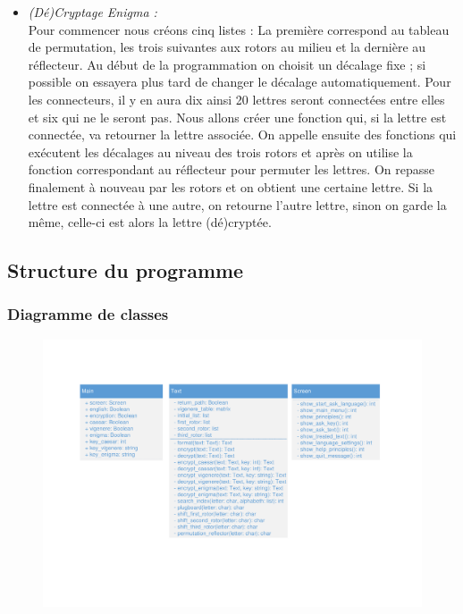 \documentclass[a4paper,12pt,abstracton,titlepage]{scrartcl}
\begin{document}
\begin{itemize}
\item \textit{(Dé)Cryptage Enigma :}\\
Pour commencer nous créons cinq listes : La première correspond au tableau de permutation, les trois suivantes aux rotors au milieu et la dernière au réflecteur. Au début de la programmation on choisit un décalage fixe ; si possible on essayera plus tard de changer le décalage automatiquement.
Pour les connecteurs, il y en aura dix ainsi 20 lettres seront connectées entre elles et six qui ne le seront pas. Nous allons créer une fonction qui, si la lettre est connectée, va retourner la lettre associée.
On appelle ensuite des fonctions qui exécutent les décalages au niveau des trois rotors et après on utilise la fonction correspondant au réflecteur pour permuter les lettres. On repasse finalement à nouveau par les rotors et on obtient une certaine lettre. Si la lettre est connectée à une autre, on retourne l’autre lettre, sinon on garde la même, celle-ci est alors la lettre (dé)cryptée.\\
\end{itemize}

\newpage
\subsection{Structure du programme}
\subsubsection{Diagramme de classes}
\begin{figure}[tpbh]
	\centering
  \includegraphics[width=\textwidth, trim=25mm 53mm 35mm 35mm, clip]{./Diagrammes/diagrammeDeClasses.pdf}
	\label{img:class}
\end{figure}
\end{document}

